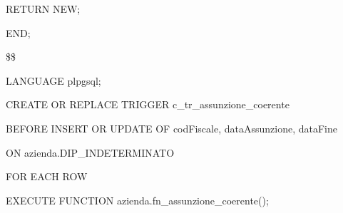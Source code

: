 \begin{flushleft}
\begin{description}
\begin{description}
                            \item RETURN NEW;
                    \end{description}
                    \item END;
                    \item \$\$
                    \item LANGUAGE plpgsql;
                \end{description}
            \end{flushleft}
        \normalfont

        \ttfamily
            \begin{flushleft}
                \begin{description}
                    \item CREATE OR REPLACE TRIGGER c\_tr\_assunzione\_coerente
                    \item BEFORE INSERT OR UPDATE OF codFiscale, dataAssunzione, dataFine
                    \item ON azienda.DIP\_INDETERMINATO
                    \item FOR EACH ROW
                    \item EXECUTE FUNCTION azienda.fn\_assunzione\_coerente();
                \end{description}
            \end{flushleft}
        \normalfont

\newpage
        

